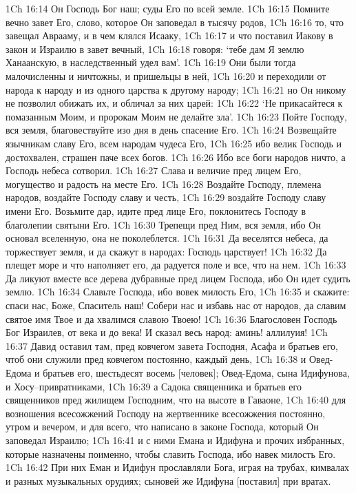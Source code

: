 1Ch 16:14  Он Господь Бог наш; суды Его по всей земле.
1Ch 16:15  Помните вечно завет Его, слово, которое Он заповедал в тысячу родов,
1Ch 16:16  то, что завещал Аврааму, и в чем клялся Исааку,
1Ch 16:17  и что поставил Иакову в закон и Израилю в завет вечный,
1Ch 16:18  говоря: `тебе дам Я землю Ханаанскую, в наследственный удел вам'.
1Ch 16:19  Они были тогда малочисленны и ничтожны, и пришельцы в ней,
1Ch 16:20  и переходили от народа к народу и из одного царства к другому народу;
1Ch 16:21  но Он никому не позволил обижать их, и обличал за них царей:
1Ch 16:22  `Не прикасайтеся к помазанным Моим, и пророкам Моим не делайте зла'.
1Ch 16:23  Пойте Господу, вся земля, благовествуйте изо дня в день спасение Его.
1Ch 16:24  Возвещайте язычникам славу Его, всем народам чудеса Его,
1Ch 16:25  ибо велик Господь и достохвален, страшен паче всех богов.
1Ch 16:26  Ибо все боги народов ничто, а Господь небеса сотворил.
1Ch 16:27  Слава и величие пред лицем Его, могущество и радость на месте Его.
1Ch 16:28  Воздайте Господу, племена народов, воздайте Господу славу и честь,
1Ch 16:29  воздайте Господу славу имени Его. Возьмите дар, идите пред лице Его, поклонитесь Господу в благолепии святыни Его.
1Ch 16:30  Трепещи пред Ним, вся земля, ибо Он основал вселенную, она не поколеблется.
1Ch 16:31  Да веселятся небеса, да торжествует земля, и да скажут в народах: Господь царствует!
1Ch 16:32  Да плещет море и что наполняет его, да радуется поле и все, что на нем.
1Ch 16:33  Да ликуют вместе все дерева дубравные пред лицем Господа, ибо Он идет судить землю.
1Ch 16:34  Славьте Господа, ибо вовек милость Его,
1Ch 16:35  и скажите: спаси нас, Боже, Спаситель наш! Собери нас и избавь нас от народов, да славим святое имя Твое и да хвалимся славою Твоею!
1Ch 16:36  Благословен Господь Бог Израилев, от века и до века! И сказал весь народ: аминь! аллилуия!
1Ch 16:37  Давид оставил там, пред ковчегом завета Господня, Асафа и братьев его, чтоб они служили пред ковчегом постоянно, каждый день,
1Ch 16:38  и Овед-Едома и братьев его, шестьдесят восемь [человек]; Овед-Едома, сына Идифунова, и Хосу--привратниками,
1Ch 16:39  а Садока священника и братьев его священников пред жилищем Господним, что на высоте в Гаваоне,
1Ch 16:40  для возношения всесожжений Господу на жертвеннике всесожжения постоянно, утром и вечером, и для всего, что написано в законе Господа, который Он заповедал Израилю;
1Ch 16:41  и с ними Емана и Идифуна и прочих избранных, которые назначены поименно, чтобы славить Господа, ибо навек милость Его.
1Ch 16:42  При них Еман и Идифун прославляли Бога, играя на трубах, кимвалах и разных музыкальных орудиях; сыновей же Идифуна [поставил] при вратах.
